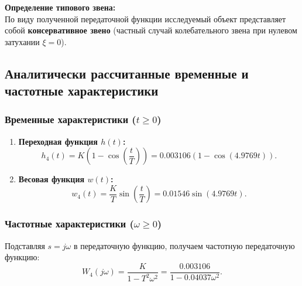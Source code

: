 \documentclass[12pt, a4paper]{article}
\begin{document}
\textbf{Определение типового звена:} \\
По виду полученной передаточной функции исследуемый объект представляет собой \textbf{консервативное звено} (частный случай колебательного звена при нулевом затухании $\xi = 0$).

\subsection{Аналитически рассчитанные временные и частотные характеристики}

\subsubsection{Временные характеристики ($t \ge 0$)}

\begin{enumerate}
    \item \textbf{Переходная функция $h(t)$:}
    \begin{equation}
        h_4(t) = K\left(1 - \cos\left(\frac{t}{T}\right)\right) = 0.003106\left(1 - \cos(4.9769t)\right).
    \end{equation}

    \item \textbf{Весовая функция $w(t)$:}
    \begin{equation}
        w_4(t) = \frac{K}{T}\sin\left(\frac{t}{T}\right) = 0.01546\sin(4.9769t).
    \end{equation}
\end{enumerate}

\subsubsection{Частотные характеристики ($\omega \ge 0$)}

Подставляя $s = j\omega$ в передаточную функцию, получаем частотную передаточную функцию:
\begin{equation*}
    W_4(j\omega) = \frac{K}{1 - T^2\omega^2} = \frac{0.003106}{1 - 0.04037\omega^2}.
\end{equation*}
\end{document}
